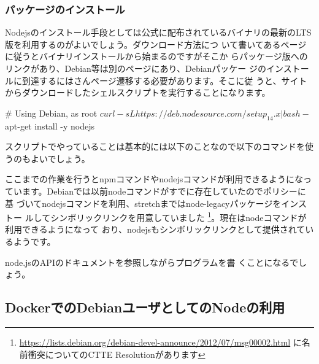 \documentclass[mingoth,a4paper]{jsarticle}
\begin{document}
\subsubsection{パッケージのインストール}

Nodejsのインストール手段としては公式に配布されているバイナリの最新のLTS
版を利用するのがよいでしょう\cite{nodejs-install}。ダウンロード方法につ
いて書いてあるページに従うとバイナリインストールから始まるのですがそこか
らパッケージ版へのリンクがあり、Debian等は別のページにあり、Debianパッケー
ジのインストールに到達するにはさんページ遷移する必要があります。そこに従
うと、サイトからダウンロードしたシェルスクリプトを実行することになります。

\begin{commandline}
# Using Debian, as root
$ curl -sL https://deb.nodesource.com/setup_14.x | bash -
$ apt-get install -y nodejs
\end{commandline}

スクリプトでやっていることは基本的には以下のことなので以下のコマンドを使うのもよいでしょう。


ここまでの作業を行うとnpmコマンドやnodejsコマンドが利用できるようになっ
ています。Debianでは以前nodeコマンドがすでに存在していたのでポリシーに基
づいてnodejsコマンドを利用、stretchまではnode-legacyパッケージをインストー
ルしてシンボリックリンクを用意していました
\footnote{\url{https://lists.debian.org/debian-devel-announce/2012/07/msg00002.html}
に名前衝突についてのCTTE Resolutionがあります}。現在はnodeコマンドが利用できるようになって
おり、nodejsもシンボリックリンクとして提供されているようです。

node.jsのAPIのドキュメント\cite{nodejs-api}を参照しながらプログラムを書
くことになるでしょう。

\subsection{DockerでのDebianユーザとしてのNodeの利用}
\end{document}
